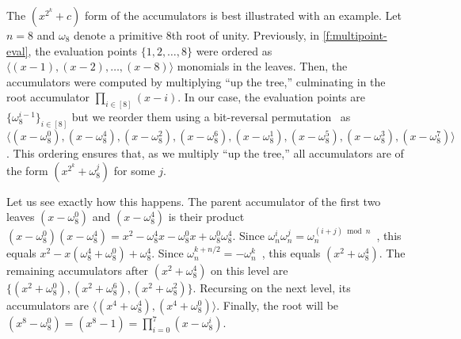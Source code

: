 The $(x^{2^k} + c)$ form of the accumulators is best illustrated with an example.
Let $n=8$ and $\omega_8$ denote a primitive 8th root of unity.
Previously, in \cref{f:multipoint-eval}, the evaluation points $\{1,2,\dots,8\}$ were ordered as $\langle (x-1), (x-2),\dots, (x-8)\rangle$ monomials in the leaves.
Then, the accumulators were computed by multiplying ``up the tree,'' culminating in the root accumulator $\prod_{i\in[8]}(x-i)$.
In our case, the evaluation points are $\{\omega_8^{i-1}\}_{i\in[8]}$ but we reorder them using a bit-reversal permutation~\cite{bitreversal-wiki} as $\langle(x-\omega_8^0), (x-\omega_8^4), (x-\omega_8^2), (x-\omega_8^6), (x-\omega_8^1), (x-\omega_8^5), (x-\omega_8^3), (x-\omega_8^7)\rangle$.
This ordering ensures that, as we multiply ``up the tree,'' all accumulators are of the form $(x^{2^k} + \omega_8^j)$ for some $j$.

Let us see exactly how this happens.
The parent accumulator of the first two leaves $(x-\omega_8^0)$ and $(x-\omega_8^4)$ is their product $(x-\omega_8^0)(x-\omega_8^4) = x^2 - \omega_8^4 x - \omega_8^0 x + \omega_8^0 \omega_8^4$.
Since $\omega_n^i \omega_n^j = \omega_n^{(i+j) \bmod n}$~\cite{CLRS09}, this equals $x^2 - x(\omega_8^4 + \omega_8^0) + \omega_8^4$.
Since $\omega_n^{k+n/2} = -\omega_n^k$~\cite{CLRS09}, this equals $(x^2 + \omega_8^4)$.
The remaining accumulators after $(x^2 + \omega_8^4)$ on this level are $\{(x^2 + \omega_8^0), (x^2 + \omega_8^6), (x^2 + \omega_8^2)\}$.
Recursing on the next level, its accumulators are $\langle(x^4 + \omega_8^4),(x^4 + \omega_8^0)\rangle$.
Finally, the root will be $(x^8-\omega_8^0) = (x^8 - 1) = \prod_{i=0}^{7}(x-\omega_8^i)$.

%
%

